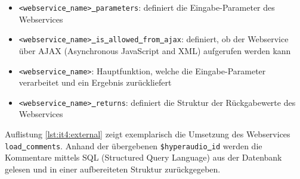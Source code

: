\begin{itemize}
\item \texttt{<webservice\underline{{ }}name>\underline{{ }}parameters}: definiert die Eingabe-Parameter des Webservices
\item \texttt{<webservice\underline{{ }}name>\underline{{ }}is\underline{{ }}allowed\underline{{ }}from\underline{{ }}ajax}: definiert, ob der Webservice über AJAX (Asynchronous JavaScript and XML) aufgerufen werden kann
\item \texttt{<webservice\underline{{ }}name>}: Hauptfunktion, welche die Eingabe-Parameter verarbeitet und ein Ergebnis zurückliefert
\item \texttt{<webservice\underline{{ }}name>\underline{{ }}returns}: definiert die Struktur der Rückgabewerte des Webservices
\end{itemize}

Auflistung \ref{lst:it4:external} zeigt exemplarisch die Umsetzung des Webservices \texttt{load\underline{{ }}comments}. Anhand der übergebenen \texttt{\$hyperaudio\underline{{ }}id} werden die Kommentare mittels SQL (Structured Query Language) aus der Datenbank gelesen und in einer aufbereiteten Struktur zurückgegeben.

